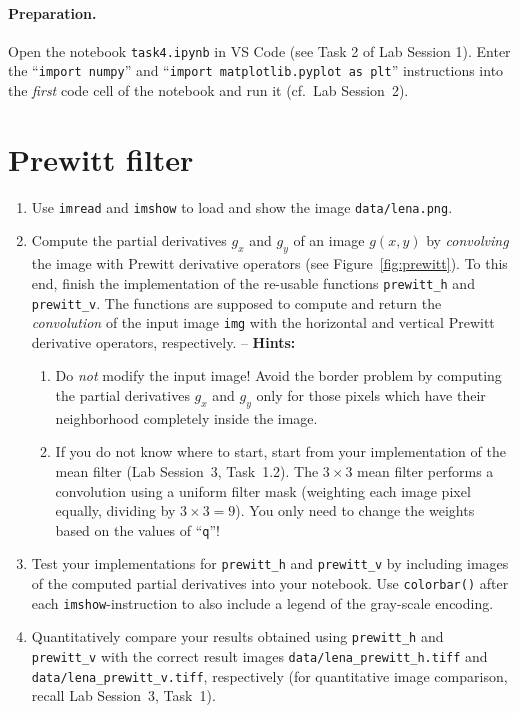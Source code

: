 \documentclass[12pt,a4paper]{article}
\begin{document}
\paragraph{Preparation.} Open the notebook \texttt{task4.ipynb} in VS Code (see Task 2 of Lab Session 1). Enter the ``\texttt{import numpy}'' and ``\texttt{import matplotlib.pyplot as plt}'' instructions into the \emph{first} code cell of the notebook and run it (cf.\ Lab Session~2).

\section{Prewitt filter}
\label{task:prewitt}
\begin{enumerate}
    \item Use \texttt{imread} and \texttt{imshow} to load and show the image \texttt{data/lena.png}.
    \item Compute the partial derivatives $g_x$ and $g_y$ of an image $g\left(x,y\right)$ by \emph{convolving} the image with Prewitt derivative operators (see Figure~\ref{fig:prewitt}). To this end, finish the implementation of the re-usable functions \texttt{prewitt\_h} and \texttt{prewitt\_v}. The functions are supposed to compute and return the \emph{convolution} of the input image \texttt{img} with the horizontal and vertical Prewitt derivative operators, respectively. -- \textbf{Hints:}
    \begin{enumerate}
        \item Do \emph{not} modify the input image! Avoid the border problem by computing the partial derivatives $g_x$ and $g_y$ only for those pixels which have their neighborhood completely inside the image.
        \item If you do not know where to start, start from your implementation of the mean filter (Lab Session~3, Task~1.2). The $3 \times 3$ mean filter performs a convolution using a uniform filter mask (weighting each image pixel equally, dividing by $3 \times 3 = 9$). You only need to change the weights based on the values of ``\texttt{q}''!
    \end{enumerate}
    \item Test your implementations for \texttt{prewitt\_h} and \texttt{prewitt\_v} by including images of the computed partial derivatives into your notebook. Use \texttt{colorbar()} after each \texttt{imshow}-instruction to also include a legend of the gray-scale encoding.
    \item Quantitatively compare your results obtained using \texttt{prewitt\_h} and \texttt{prewitt\_v} with the correct result images \texttt{data/lena\_prewitt\_h.tiff} and \texttt{data/lena\_\-prewitt\_\-v.tiff}, respectively (for quantitative image comparison, recall Lab Session~3, Task~1).
\end{enumerate}
\end{document}
